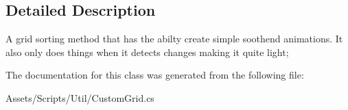 \subsection{Detailed Description}
A grid sorting method that has the abilty create simple soothend animations. It also only does things when it detects changes making it quite light; 



The documentation for this class was generated from the following file\+:\begin{DoxyCompactItemize}
\item 
Assets/\+Scripts/\+Util/Custom\+Grid.\+cs\end{DoxyCompactItemize}
